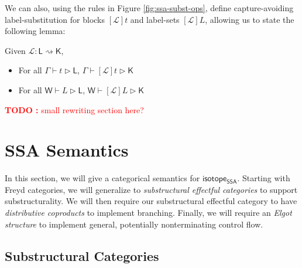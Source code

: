 \documentclass[acmsmall,screen,review]{acmart}
\newcounter{todos}
\newcommand{\TODO}[1]{{
  \stepcounter{todos}
  \begin{center}\large{\textcolor{red}{\textbf{TODO \arabic{todos}:} #1}}\end{center}
}}
\newcommand{\mc}[1]{\ensuremath{\mathcal{#1}}}
\newcommand{\ms}[1]{\ensuremath{\mathsf{#1}}}
\newcommand{\csplits}[3]{#1 \mapsto #2;#3}
\newcommand{\haslb}[3]{#1 \vdash #2 \rhd #3}
\newcommand{\lhaslb}[3]{#1 \vdash #2 \rhd #3}
\newcommand{\issubst}[3]{#1: #2 \mapsto #3}
\newcommand{\lbsubst}[3]{#1: #2 \rightsquigarrow #3}
\newcommand{\isotopessa}{\ms{isotope_{SSA}}}
\begin{document}


We can also, using the rules in Figure \ref{fig:ssa-subst-ops}, define
capture-avoiding label-substitution for blocks \([\mc{L}]t\) and label-sets
\([\mc{L}]L\), allowing us to state the following lemma:
\begin{lemma} 
  Given \(\lbsubst{\mc{L}}{\ms{L}}{\ms{K}}\), 
  \begin{itemize}
    \item For all \(\haslb{\Gamma}{t}{\ms{L}}\),
    \(\haslb{\Gamma}{[\mc{L}]t}{\ms{K}}\)
    \item For all \(\lhaslb{\ms{W}}{L}{\ms{L}}\),
    \(\lhaslb{\ms{W}}{[\mc{L}]L}{\ms{K}}\)
  \end{itemize}
\end{lemma}

\TODO{small rewriting section here?}

\section{SSA Semantics}

\label{sec:semantics}

In this section, we will give a categorical semantics for \isotopessa. Starting
with Freyd categories, we will generalize to \textit{substructural effectful
categories} to support substructurality. We will then require our substructural
effectful category to have \textit{distributive coproducts} to implement
branching. Finally, we will require an \textit{Elgot structure} to implement
general, potentially nonterminating control flow.

\subsection{Substructural Categories}
\end{document}
